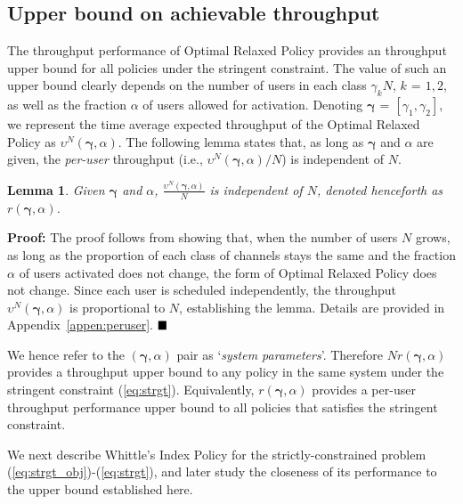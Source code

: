 \documentclass[11pt,twocolumn]{IEEEtran}
\newtheorem{lemma}{Lemma}
\begin{document}
\subsection{Upper bound on achievable throughput}
The throughput performance of Optimal Relaxed Policy provides an throughput
upper bound for all policies under the stringent constraint. The
value of such an upper bound clearly depends on the number of users
in each class $\gamma_k N$, $k\hspace{1pt}{=}\hspace{1pt}1,2$, as well as the fraction
$\alpha$ of users allowed for activation. Denoting $\bm
\gamma\hspace{1pt}{=}\hspace{1pt}[\gamma_1, \gamma_2]$, we represent the time average expected throughput of the Optimal Relaxed Policy as
$\upsilon^N(\bm \gamma, \alpha)$. The following lemma states
that, as long as $\bm \gamma$ and $\alpha$ are given, the \emph{per-user} throughput (i.e., $\upsilon^N(\bm \gamma, \alpha)/N$) is independent of $N$.

\begin{lemma}
\label{lemma:parameter}
Given $\bm \gamma$ and $\alpha$, $\frac{\upsilon^N(\bm \gamma, \alpha)}{N}$ is independent of $N$, denoted henceforth as $r(\bm \gamma,\alpha)$.
\end{lemma}

\noindent \textbf{Proof:} The proof follows from showing that, when the number of users $N$ grows, as long as the proportion of each class of channels stays the same and the fraction $\alpha$ of users activated does not change, the form of Optimal Relaxed Policy does not change. Since each user is scheduled independently, the throughput $\upsilon^N(\bm \gamma, \alpha)$ is proportional to $N$, establishing the lemma. Details are provided in Appendix~\ref{appen:peruser}. $\hfill \blacksquare$

\vspace{3pt}

We hence refer to the $(\bm \gamma, \alpha)$ pair as `\emph{system parameters}'. Therefore $N r(\bm \gamma, \alpha)$ provides a throughput upper bound to any policy in the same system under the stringent constraint (\ref{eq:strgt}). Equivalently, $r(\bm \gamma, \alpha)$ provides a per-user throughput performance upper bound to all policies that satisfies the stringent constraint.

We next describe Whittle's Index Policy for the strictly-constrained problem (\ref{eq:strgt_obj})-(\ref{eq:strgt}), and later study the closeness of its performance to the upper bound established here.
\end{document}
